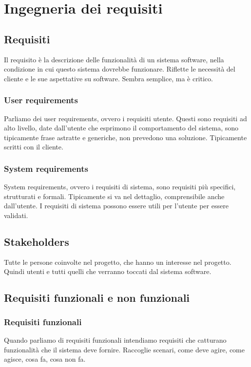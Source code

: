 \chapter{Ingegneria dei requisiti}
\section{Requisiti}
Il requisito è la descrizione delle funzionalità di un sistema software,
nella condizione in cui questo sistema dovrebbe funzionare. Riflette le 
necessità del cliente e le sue aspettative su software. Sembra semplice, ma 
è critico.

\subsection{User requirements}
Parliamo dei user requirements, ovvero i requisiti utente. Questi sono
requisiti ad alto livello, date dall'utente che esprimono il comportamento del sistema,
sono tipicamente frase astratte e generiche, non prevedono una soluzione.
Tipicamente scritti con il cliente.

\subsection{System requirements}
System requirements, ovvero i requisiti di sistema, sono requisiti più specifici,
strutturati e formali. Tipicamente si va nel dettaglio, comprensibile anche 
dall'utente.
I requisiti di sistema possono essere utili per l'utente per essere validati.

\section{Stakeholders}
Tutte le persone coinvolte nel progetto,
che hanno un interesse nel progetto. Quindi utenti e tutti quelli che verranno 
toccati dal sistema software.

\section{Requisiti funzionali e non funzionali}
\subsection{Requisiti funzionali}
Quando parliamo di requisiti funzionali intendiamo requisiti che catturano 
funzionalità che il sistema deve fornire. Raccoglie scenari, come deve agire, 
come agisce, cosa fa, cosa non fa.

